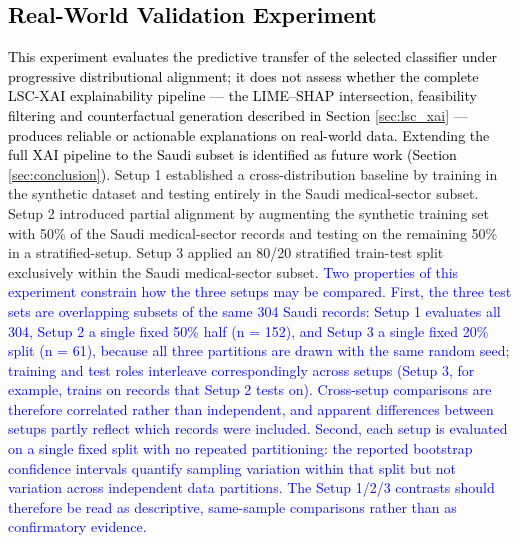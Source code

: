 \documentclass[a4paper,fleqn]{cas-sc}
\begin{document}
\subsection{\textcolor{black}{Real-World Validation Experiment}}
\label{real-world}
\textcolor{black}{This experiment evaluates the predictive transfer of the selected classifier under progressive distributional alignment; it does not assess whether the complete LSC-XAI explainability pipeline — the LIME–SHAP intersection, feasibility filtering and counterfactual generation described in Section \ref{sec:lsc_xai} — produces reliable or actionable explanations on real-world data. Extending the full XAI pipeline to the Saudi subset is identified as future work (Section \ref{sec:conclusion}).}
Setup 1 established a cross-distribution baseline by training in the synthetic dataset \cite{KaggleHealthcareAttrition} and testing entirely in the Saudi medical-sector subset. 
Setup 2 introduced partial alignment by augmenting the synthetic training set with 50\% of the Saudi medical-sector records and testing on the remaining 50\% in a stratified-setup. 
Setup 3 applied an 80/20 stratified train-test split exclusively within the Saudi medical-sector subset.
\textcolor{blue}{Two properties of this experiment constrain how the three setups may be compared. First, the three test sets are overlapping subsets of the same 304 Saudi records: Setup 1 evaluates all 304, Setup 2 a single fixed 50\% half (n = 152), and Setup 3 a single fixed 20\% split (n = 61), because all three partitions are drawn with the same random seed; training and test roles interleave correspondingly across setups (Setup 3, for example, trains on records that Setup 2 tests on). Cross-setup comparisons are therefore correlated rather than independent, and apparent differences between setups partly reflect which records were included. Second, each setup is evaluated on a single fixed split with no repeated partitioning: the reported bootstrap confidence intervals quantify sampling variation within that split but not variation across independent data partitions. The Setup 1/2/3 contrasts should therefore be read as descriptive, same-sample comparisons rather than as confirmatory evidence.}
\end{document}
